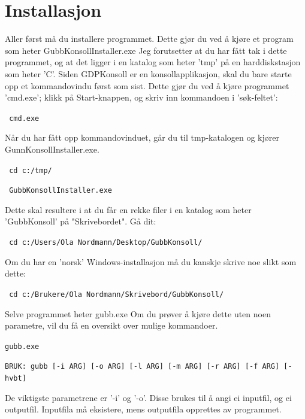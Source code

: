 \documentclass[12pt]{book}
\begin{document}
\newpage

\section{Installasjon}

Aller først må du installere programmet. Dette gjør du ved å kjøre et program som heter GubbKonsollInstaller.exe Jeg forutsetter at du har fått tak i dette programmet, og at det ligger i en katalog som heter 'tmp' på en harddiskstasjon som heter 'C'. Siden GDPKonsoll er en konsollapplikasjon, skal du bare starte opp et kommandovindu først som sist. Dette gjør du ved å kjøre programmet 'cmd.exe'; klikk på Start-knappen, og skriv inn kommandoen i 'søk-feltet':

\begin{alltt}
\texttt{ cmd.exe  {\Return} }
\end{alltt}

Når du har fått opp kommandovinduet, går du til tmp-katalogen og kjører GunnKonsollInstaller.exe.

\begin{alltt}
\texttt{ cd c:/tmp/  {\Return} }

\texttt{ GubbKonsollInstaller.exe  {\Return} }
\end{alltt}

Dette skal resultere i at du får en rekke filer i en katalog som heter  'GubbKonsoll'  på "Skrivebordet". Gå dit:

\begin{alltt}
\texttt{ cd c:/Users/Ola Nordmann/Desktop/GubbKonsoll/  {\Return} }
\end{alltt}

Om du har en 'norsk' Windows-installasjon må du kanskje skrive noe slikt som dette:

\begin{alltt}
\texttt{ cd c:/Brukere/Ola Nordmann/Skrivebord/GubbKonsoll/  {\Return} }
\end{alltt}


Selve programmet heter gubb.exe Om du prøver å kjøre dette uten noen parametre, vil du få en oversikt over mulige kommandoer.

\begin{alltt}
\texttt{gubb.exe  {\Return} }

\texttt{BRUK: gubb [-i ARG] [-o ARG] [-l ARG] [-m ARG] [-r ARG] [-f ARG] [-hvbt]  }
\end{alltt}

De viktigste parametrene er '-i' og '-o'. Disse brukes til å angi ei inputfil, og ei outputfil. Inputfila må eksistere, mens outputfila opprettes av programmet.
\end{document}
